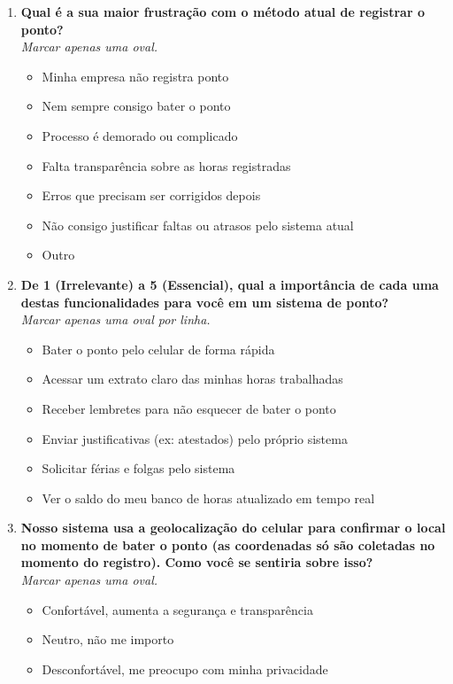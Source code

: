 \begin{apendicesenv}
\begin{enumerate}
  \item \textbf{Qual é a sua maior frustração com o método atual de registrar o ponto?} \\
        \textit{Marcar apenas uma oval.}
        \begin{itemize}
          \item Minha empresa não registra ponto
          \item Nem sempre consigo bater o ponto
          \item Processo é demorado ou complicado
          \item Falta transparência sobre as horas registradas
          \item Erros que precisam ser corrigidos depois
          \item Não consigo justificar faltas ou atrasos pelo sistema atual
          \item Outro
        \end{itemize}

  \item \textbf{De 1 (Irrelevante) a 5 (Essencial), qual a importância de cada uma destas funcionalidades para você em um sistema de ponto?} \\
        \textit{Marcar apenas uma oval por linha.}
        \begin{itemize}
          \item Bater o ponto pelo celular de forma rápida
          \item Acessar um extrato claro das minhas horas trabalhadas
          \item Receber lembretes para não esquecer de bater o ponto
          \item Enviar justificativas (ex: atestados) pelo próprio sistema
          \item Solicitar férias e folgas pelo sistema
          \item Ver o saldo do meu banco de horas atualizado em tempo real
        \end{itemize}

  \item \textbf{Nosso sistema usa a geolocalização do celular para confirmar o local no momento de bater o ponto (as coordenadas só são coletadas no momento do registro). Como você se sentiria sobre isso?} \\
        \textit{Marcar apenas uma oval.}
        \begin{itemize}
          \item Confortável, aumenta a segurança e transparência
          \item Neutro, não me importo
          \item Desconfortável, me preocupo com minha privacidade
        \end{itemize}


\end{enumerate}
\end{apendicesenv}
